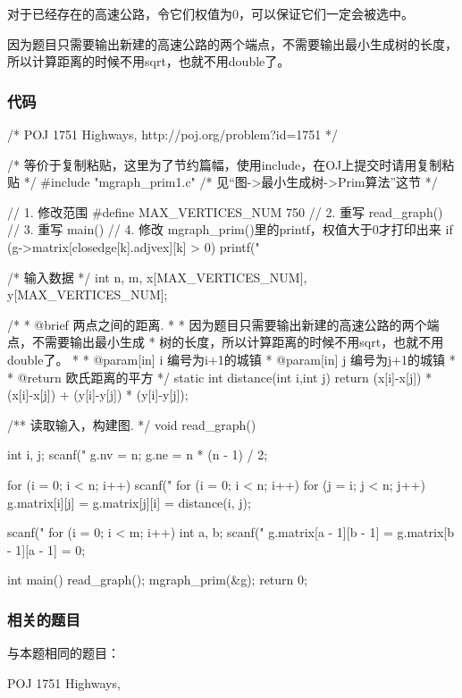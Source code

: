 对于已经存在的高速公路，令它们权值为0，可以保证它们一定会被选中。

因为题目只需要输出新建的高速公路的两个端点，不需要输出最小生成树的长度，所以计算距离的时候不用sqrt，也就不用double了。

\subsubsection{代码}
\begin{Codex}[label=poj_1751_highways_prim.c]
/* POJ 1751 Highways, http://poj.org/problem?id=1751 */

/* 等价于复制粘贴，这里为了节约篇幅，使用include，在OJ上提交时请用复制粘贴 */
#include "mgraph_prim1.c"  /* 见“图->最小生成树->Prim算法”这节 */

// 1. 修改范围
#define MAX_VERTICES_NUM 750
// 2. 重写 read_graph()
// 3. 重写 main()
// 4. 修改 mgraph_prim()里的printf，权值大于0才打印出来
if (g->matrix[closedge[k].adjvex][k] > 0)
    printf("%

/* 输入数据 */
int n, m, x[MAX_VERTICES_NUM], y[MAX_VERTICES_NUM];

/*
 * @brief 两点之间的距离.
 *
 * 因为题目只需要输出新建的高速公路的两个端点，不需要输出最小生成
 * 树的长度，所以计算距离的时候不用sqrt，也就不用double了。
 *
 * @param[in] i 编号为i+1的城镇
 * @param[in] j 编号为j+1的城镇
 *
 * @return 欧氏距离的平方
 */
static int distance(int i,int j) {
    return (x[i]-x[j]) * (x[i]-x[j]) + (y[i]-y[j]) * (y[i]-y[j]);
}

/** 读取输入，构建图. */
void read_graph() {
    int i, j;
    scanf("%
    g.nv = n;
    g.ne = n * (n - 1) / 2;

    for (i = 0; i < n; i++)
        scanf("%
    for (i = 0; i < n; i++)
        for (j = i; j < n; j++)
            g.matrix[i][j] = g.matrix[j][i] = distance(i, j);

    scanf("%
    for (i = 0; i < m; i++) {
        int a, b;
        scanf("%
        g.matrix[a - 1][b - 1] = g.matrix[b - 1][a - 1] = 0;
    }
}

int main() {
    read_graph();
    mgraph_prim(&g);
    return 0;
}
\end{Codex}

\subsubsection{相关的题目}
与本题相同的题目：
\begindot
\item POJ 1751 Highways, 
\myenddot

